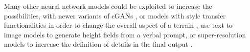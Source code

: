 

Many other neural network models could be exploited to increase the possibilities, with newer variants of cGANs \cite{Park2019}, or models with style transfer functionalities \cite{Gatys2015,Zhu2020} in order to change the overall aspect of a terrain \cite{Perche2023a,Perche2023b}, use text-to-image models \cite{Rombach2021,Radford2021} to generate height fields from a verbal prompt, or super-resolution models \cite{Dong2014} to increase the definition of details in the final output \cite{Guerin2016a}.
